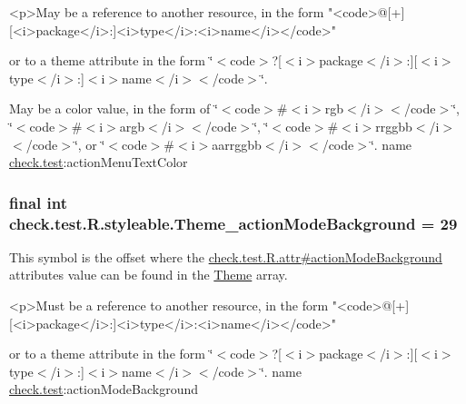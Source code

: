 \begin{DoxyVerb}      <p>May be a reference to another resource, in the form "<code>@[+][<i>package</i>:]<i>type</i>:<i>name</i></code>"
\end{DoxyVerb}
 or to a theme attribute in the form \char`\"{}$<$code$>$?\mbox{[}$<$i$>$package$<$/i$>$\+:\mbox{]}\mbox{[}$<$i$>$type$<$/i$>$\+:\mbox{]}$<$i$>$name$<$/i$>$$<$/code$>$\char`\"{}. 

May be a color value, in the form of \char`\"{}$<$code$>$\#$<$i$>$rgb$<$/i$>$$<$/code$>$\char`\"{}, \char`\"{}$<$code$>$\#$<$i$>$argb$<$/i$>$$<$/code$>$\char`\"{}, \char`\"{}$<$code$>$\#$<$i$>$rrggbb$<$/i$>$$<$/code$>$\char`\"{}, or \char`\"{}$<$code$>$\#$<$i$>$aarrggbb$<$/i$>$$<$/code$>$\char`\"{}.  name \hyperlink{namespacecheck_1_1test}{check.\+test}\+:action\+Menu\+Text\+Color \hypertarget{classcheck_1_1test_1_1_r_1_1styleable_a51942708f6a610b1ec0a9c2fca839459}{}
\subsubsection[{Theme\+\_\+action\+Mode\+Background}]{\setlength{\rightskip}{0pt plus 5cm}final int check.\+test.\+R.\+styleable.\+Theme\+\_\+action\+Mode\+Background = 29\hspace{0.3cm}{\ttfamily [static]}}\label{classcheck_1_1test_1_1_r_1_1styleable_a51942708f6a610b1ec0a9c2fca839459}
This symbol is the offset where the \hyperlink{classcheck_1_1test_1_1_r_1_1attr_a4b63c85a0ab6b03ffd464efc207712d8}{check.\+test.\+R.\+attr\#action\+Mode\+Background} attribute\textquotesingle{}s value can be found in the \hyperlink{classcheck_1_1test_1_1_r_1_1styleable_acca726d02016a0cf607782ec3a436a81}{Theme} array.

\begin{DoxyVerb}      <p>Must be a reference to another resource, in the form "<code>@[+][<i>package</i>:]<i>type</i>:<i>name</i></code>"
\end{DoxyVerb}
 or to a theme attribute in the form \char`\"{}$<$code$>$?\mbox{[}$<$i$>$package$<$/i$>$\+:\mbox{]}\mbox{[}$<$i$>$type$<$/i$>$\+:\mbox{]}$<$i$>$name$<$/i$>$$<$/code$>$\char`\"{}.  name \hyperlink{namespacecheck_1_1test}{check.\+test}\+:action\+Mode\+Background \hypertarget{classcheck_1_1test_1_1_r_1_1styleable_ab30e73a8022e0a0d45477373a56e8594}{}
